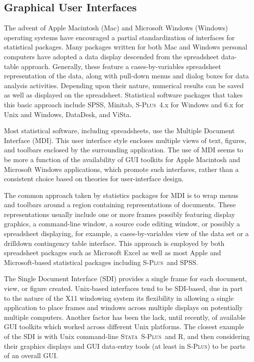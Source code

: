\documentclass{article}
\newcommand*{\Splus}{\textsc{S-Plus}}
\newcommand*{\Stata}{\textsc{Stata}}
\begin{document}

\subsection{Graphical User Interfaces}
\label{sec:UI:GUI}

The advent of Apple Macintosh (Mac) and Microsoft Windows (Windows)
operating systems have encouraged a partial standardization of
interfaces for statistical packages.  Many packages written for both
Mac and Windows personal computers have adopted a data display
descended from the spreadsheet data-table approach.  Generally, these
feature a cases-by-variables spreadsheet representation of the data,
along with pull-down menus and dialog boxes for data analysis
activities.  Depending upon their nature, numerical results can be
saved as well as displayed on the spreadsheet.  Statistical software
packages that takes this basic approach include SPSS, Minitab, \Splus\ 
4.x for Windows and 6.x for Unix and Windows, DataDesk, and ViSta.

Most statistical software, including spreadsheets, use the Multiple
Document Interface (MDI).  This user interface style encloses multiple
views of text, figures, and toolbars enclosed by the surrounding
application.  The use of MDI seems to be more a function of the
availability of GUI toolkits for Apple Macintosh and Microsoft Windows
applications, which promote such interfaces, rather than a consistent
choice based on theories for user-interface design.  

The common approach taken by statistics packages for MDI is to wrap
menus and toolbars around a region containing representations of
documents.  These representations usually include one or more frames
possibly featuring display graphics, a command-line window, a source
code editing window, or possibly a spreadsheet displaying, for
example, a cases-by-variables view of the data set or a drilldown
contingency table interface.  This approach is employed by both
spreadsheet packages such as Microsoft Excel as well as most Apple and
Microsoft-based statistical packages including \Splus\ and SPSS.

The Single Document Interface (SDI) provides a single frame for each
document, view, or figure created.  Unix-based interfaces tend to be
SDI-based, due in part to the nature of the X11 windowing system its
flexibility in allowing a single application to place frames and
windows across multiple displays on potentially multiple computers.
Another factor has been the lack, until recently, of available GUI
toolkits which worked across different Unix platforms.  The closest
example of the SDI is with Unix command-line \Stata\, \Splus\, and R,
and then considering their graphics displays and GUI data-entry tools
(at least in \Splus) to be parts of an overall GUI.
\end{document}
